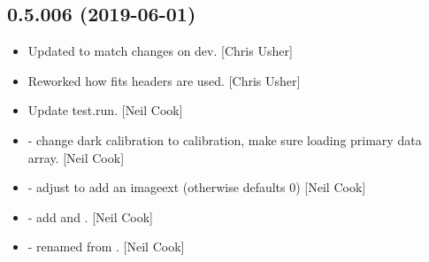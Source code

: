 \documentclass[a4paper,10pt,english]{report}
\begin{document}
\subsection{0.5.006 (2019-06-01)}
\label{\detokenize{misc/changelog:id130}}\begin{itemize}
\item {} 
Updated to match changes on dev. {[}Chris Usher{]}

\item {} 
Reworked how fits headers are used. {[}Chris Usher{]}

\item {} 
Update test.run. {[}Neil Cook{]}

\item {} 
 - change dark calibration to  calibration,
make sure  loading primary data array. {[}Neil Cook{]}

\item {} 
 - adjust  to add an imageext (otherwise
defaults 0) {[}Neil Cook{]}

\item {} 
 - add  and . {[}Neil
Cook{]}

\item {} 
 - renamed from . {[}Neil
Cook{]}

\end{itemize}
\end{document}
